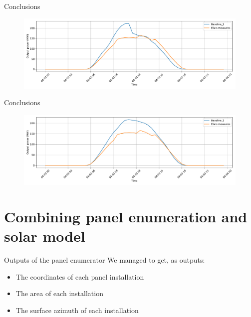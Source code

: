 \documentclass[12pt]{beamer}
\begin{document}
\begin{frame}{Conclusions}
    \begin{figure}
    \centering
    \includegraphics[width=\textwidth]{resources/pdf/baseline_1 (27-03-2020).pdf}
    \label{fig:base_1_elia_3_april}
    \end{figure}
\end{frame}

\begin{frame}{Conclusions}
    \begin{figure}
    \centering
    \includegraphics[width=\textwidth]{resources/pdf/baseline_2 (27-03-2020).pdf}
    \label{fig:base_2_elia_3_april}
    \end{figure}
\end{frame}

\section{Combining panel enumeration and solar model}
\begin{frame}{Outputs of the panel enumerator}
    We managed to get, as outputs:
    \begin{itemize}
        \item The \alert{coordinates} of each panel installation
        \item The \alert{area} of each installation
        \item The \alert{surface azimuth} of each installation
    \end{itemize}
\end{frame}
\end{document}
